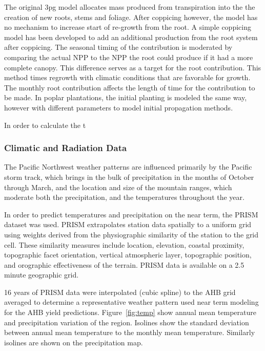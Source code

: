 \documentclass[preprint,12pt]{elsarticle}
\begin{document}
The original \ac{3pg} model allocates mass produced from transpiration
into the the creation of new roots, stems and foliage.  After
coppicing however, the model has no mechanism to increase start of
re-growth from the root.  A simple coppicing model has been developed
to add an additional production from the root system after
coppicing\cite{Hart2014}.  The seasonal timing of the
contribution is moderated by comparing the actual \ac{NPP} to the
\ac{NPP} the root could produce if it had a more complete canopy.
This difference serves as a target for the root contribution.  This
method times regrowth with climatic conditions that are favorable for
growth.  The monthly root contribution affects the length of time for
the contribution to be made.  In poplar plantations, the initial
planting is modeled the same way, however with different parameters to
model initial propagation methods.

In order to calculate the t

\subsubsection{Climatic and Radiation Data}
\label{sec:climate}


The Pacific Northwest weather patterns are influenced primarily by the
Pacific storm track, which brings in the bulk of precipitation in the
months of October through March, and the location and size of the
mountain ranges, which moderate both the precipitation, and the
temperatures throughout the year.

In order to predict temperatures and precipitation on the near term,
the \acf{PRISM} dataset was used.  \ac{PRISM} extrapolates station
data spatially to a uniform grid using weights derived from the
physiographic similarity of the station to the grid cell. These
similarity measures include location, elevation, coastal proximity,
topographic facet orientation, vertical atmospheric layer, topographic
position, and orographic effectiveness of the terrain.  \ac{PRISM}
data is available on a 2.5 minute geographic grid.

16 years of \ac{PRISM} data were interpolated (cubic spline) to the
\ac{AHB} grid averaged to determine a representative weather pattern
used near term modeling for the \ac{AHB} yield predictions.
Figure~\ref{fig:temp} show annual mean temperature and precipitation
variation of the region.  Isolines show the standard deviation between
annual mean temperature to the monthly mean temperature.  Similarly
isolines are shown on the precipitation map.
\end{document}
